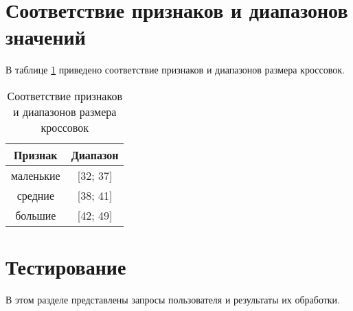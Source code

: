\clearpage


\section{Соответствие признаков и диапазонов значений}

В таблице \ref{tbl:prizn} приведено соответствие признаков и диапазонов размера кроссовок.

\begin{table}[h!]
	\centering
	\caption{Соответствие признаков и диапазонов размера кроссовок}
	\begin{tabular}{ |c|c| }
		\hline
		Признак & Диапазон\\
		\hline
		маленькие & [32; 37]\\
		\hline
		средние & [38; 41]\\
		\hline
		большие & [42; 49]\\
		\hline
	\end{tabular}
	\label{tbl:prizn}
\end{table}
\clearpage

\section{Тестирование}
В этом разделе представлены запросы пользователя и результаты их обработки.




